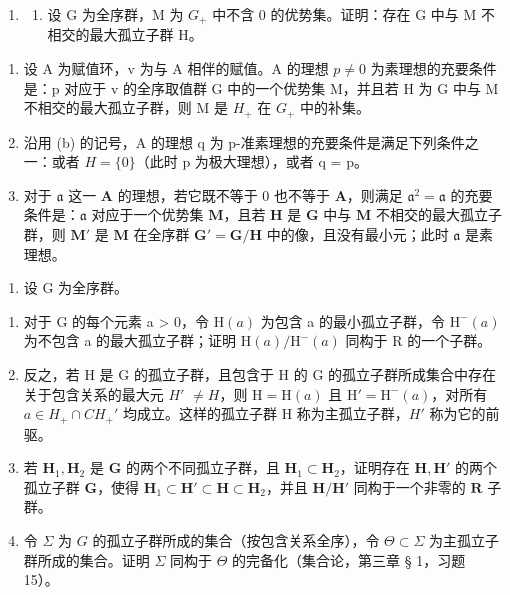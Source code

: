 
\begin{enumerate}
\def\labelenumi{\arabic{enumi}.}
\tightlist
\item
  \begin{enumerate}
  \def\labelenumii{(\alph{enumii})}
  \tightlist
  \item
    设 G 为全序群，M 为 \(G_{+}\) 中不含 0 的优势集。证明：存在 G 中与 M 不相交的最大孤立子群 H。
  \end{enumerate}
\end{enumerate}

\begin{enumerate}
\def\labelenumi{(\alph{enumi})}
\setcounter{enumi}{1}
\item
  设 A 为赋值环，v 为与 A 相伴的赋值。A 的理想 \(p \neq 0\) 为素理想的充要条件是：p 对应于 v 的全序取值群 G 中的一个优势集 M，并且若 H 为 G 中与 M 不相交的最大孤立子群，则 M 是 \(H_{+}\) 在 \(G_{+}\) 中的补集。
\item
  沿用 (b) 的记号，A 的理想 q 为 p-准素理想的充要条件是满足下列条件之一：或者 \(H = \{0\}\)（此时 p 为极大理想），或者 q = p。
\item
  对于 \(\mathfrak{a}\) 这一 \(\mathbf{A}\) 的理想，若它既不等于 0 也不等于 \(\mathbf{A}\)，则满足 \(\mathfrak{a}^2 = \mathfrak{a}\) 的充要条件是：\(\mathfrak{a}\) 对应于一个优势集 \(\mathbf{M}\)，且若 \(\mathbf{H}\) 是 \(\mathbf{G}\) 中与 \(\mathbf{M}\) 不相交的最大孤立子群，则 \(\mathbf{M}'\) 是 \(\mathbf{M}\) 在全序群 \(\mathbf{G}' = \mathbf{G} / \mathbf{H}\) 中的像，且没有最小元；此时 \(\mathfrak{a}\) 是素理想。
\end{enumerate}

\begin{enumerate}
\def\labelenumi{\arabic{enumi}.}
\setcounter{enumi}{1}
\tightlist
\item
  设 G 为全序群。
\end{enumerate}

\begin{enumerate}
\def\labelenumi{(\alph{enumi})}
\item
  对于 G 的每个元素 a \textgreater{} 0，令 \(\mathrm{H}(a)\) 为包含 a 的最小孤立子群，令 \(\mathrm{H}^{-}(a)\) 为不包含 a 的最大孤立子群；证明 \(\mathrm{H}(a)/\mathrm{H}^{-}(a)\) 同构于 R 的一个子群。
\item
  反之，若 H 是 G 的孤立子群，且包含于 H 的 G 的孤立子群所成集合中存在关于包含关系的最大元 \(H'\) \(\neq H\)，则 \(\mathrm{H} = \mathrm{H}(a)\) 且 \(\mathrm{H}' = \mathrm{H}^{-}(a)\)，对所有 \(a \in H_{+} \cap CH_{+}'\) 均成立。这样的孤立子群 H 称为主孤立子群，\(H'\) 称为它的前驱。
\item
  若 \(\mathbf{H}_1, \mathbf{H}_2\) 是 \(\mathbf{G}\) 的两个不同孤立子群，且 \(\mathbf{H}_1 \subset \mathbf{H}_2\)，证明存在 \(\mathbf{H}, \mathbf{H}'\) 的两个孤立子群 \(\mathbf{G}\)，使得 \(\mathbf{H}_1 \subset \mathbf{H}' \subset \mathbf{H} \subset \mathbf{H}_2\)，并且 \(\mathbf{H} / \mathbf{H}'\) 同构于一个非零的 \(\mathbf{R}\) 子群。
\item
  令 \(\Sigma\) 为 \(G\) 的孤立子群所成的集合（按包含关系全序），令 \(\Theta \subset \Sigma\) 为主孤立子群所成的集合。证明 \(\Sigma\) 同构于 \(\Theta\) 的完备化（集合论，第三章 § 1，习题 15）。
\end{enumerate}


